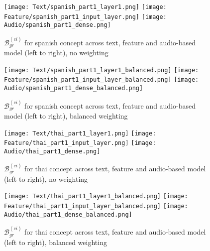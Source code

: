 \begin{figure}[H]
    \centering
    \begin{minipage}[t]{0.48\textwidth}
        \centering
        \texttt{[image: Text/spanish\_part1\_layer1.png]}
        \hfill
        \texttt{[image: Feature/spanish\_part1\_input\_layer.png]}
        \texttt{[image: Audio/spanish\_part1\_dense.png]}
        \caption{$\mathcal{B}^{(ci)}_{gr}$ for spanish concept across text, feature and audio-based model (left to right), no weighting}
        \label{fig:grad_spanish}
    \end{minipage}
    \hfill
    \begin{minipage}[t]{0.48\textwidth}
        \centering
        \texttt{[image: Text/spanish\_part1\_layer1\_balanced.png]}
        \hfill
        \texttt{[image: Feature/spanish\_part1\_input\_layer\_balanced.png]}
        \texttt{[image: Audio/spanish\_part1\_dense\_balanced.png]}
        \caption{$\mathcal{B}^{(ci)}_{gr}$ for spanish concept across text, feature and audio-based model (left to right), balanced weighting}
        \label{fig:grad_spanish_balanced}
    \end{minipage}
\end{figure}

\begin{figure}[H]
    \centering
    \begin{minipage}[t]{0.48\textwidth}
        \centering
        \texttt{[image: Text/thai\_part1\_layer1.png]}
        \hfill
        \texttt{[image: Feature/thai\_part1\_input\_layer.png]}
        \texttt{[image: Audio/thai\_part1\_dense.png]}
        \caption{$\mathcal{B}^{(ci)}_{gr}$ for thai concept across text, feature and audio-based model (left to right), no weighting}
        \label{fig:grad_thai}
    \end{minipage}
    \hfill
    \begin{minipage}[t]{0.48\textwidth}
        \centering
        \texttt{[image: Text/thai\_part1\_layer1\_balanced.png]}
        \hfill
        \texttt{[image: Feature/thai\_part1\_input\_layer\_balanced.png]}
        \texttt{[image: Audio/thai\_part1\_dense\_balanced.png]}
        \caption{$\mathcal{B}^{(ci)}_{gr}$ for thai concept across text, feature and audio-based model (left to right), balanced weighting}
        \label{fig:grad_thai_balanced}
    \end{minipage}
\end{figure}

